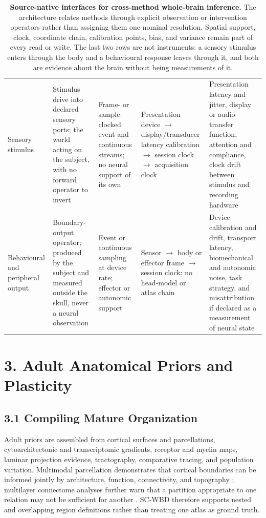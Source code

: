 \begin{table}[t]
\begin{tabularx}{\textwidth}{@{}p{}p{}p{}p{}X@{}}
Sensory stimulus &
Stimulus drive into declared sensory ports; the world acting on the subject, with no forward operator to invert &
Frame- or sample-clocked event and continuous streams; no neural support of its own &
Presentation device \(\rightarrow\) display/transducer latency calibration \(\rightarrow\) session clock \(\rightarrow\) acquisition clock &
Presentation latency and jitter, display or audio transfer function, attention and compliance, clock drift between stimulus and recording hardware\\

Behavioural and peripheral output &
Boundary-output operator; produced by the subject and measured outside the skull, never a neural observation &
Event or continuous sampling at device rate; effector or autonomic support &
Sensor \(\rightarrow\) body or effector frame \(\rightarrow\) session clock; no head-model or atlas chain &
Device calibration and drift, transport latency, biomechanical and autonomic noise, task strategy, and misattribution if declared as a measurement of neural state\\
\bottomrule
\end{tabularx}
\caption{\textbf{Source-native interfaces for cross-method whole-brain inference.}
The architecture relates methods through explicit observation or intervention
operators rather than assigning them one nominal resolution. Spatial support,
clock, coordinate chain, calibration points, bias, and variance remain part of
every read or write. The last two rows are not instruments: a sensory stimulus
enters through the body and a behavioural response leaves through it, and both
are evidence about the brain without being measurements of it.}
\label{tab:modalities}
\end{table}

\section{3. Adult Anatomical Priors and Plasticity}

\subsection{3.1 Compiling Mature Organization}

Adult priors are assembled from cortical surfaces and parcellations,
cytoarchitectonic and transcriptomic gradients, receptor and myelin maps,
laminar projection evidence, tractography, comparative tracing, and population
variation. Multimodal parcellation demonstrates that cortical boundaries can
be informed jointly by architecture, function, connectivity, and topography
\citep{glasser2016}; multilayer connectome analyses further warn that a
partition appropriate to one relation may not be sufficient for another
\citep{albers2022}. SC-WBD therefore supports nested and overlapping region
definitions rather than treating one atlas as ground truth.


